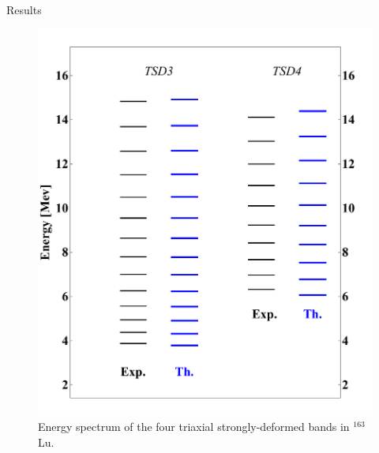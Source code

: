 \documentclass[final]{beamer}
\newlength{\colwidth}
\begin{document}
\begin{frame}[t]
\begin{columns}[t]
\begin{column}{\colwidth}
\begin{block}{Results}
\begin{figure}
\begin{minipage}{.5\textwidth}
 \includegraphics[scale=0.8]{images/TSD-34.pdf}
\end{minipage}
\caption{Energy spectrum of the four triaxial strongly-deformed bands in $^{163}$Lu.}
    \label{tsd-bands}
\end{figure}


\end{block}
\end{column}
\end{columns}
\end{frame}
\end{document}
